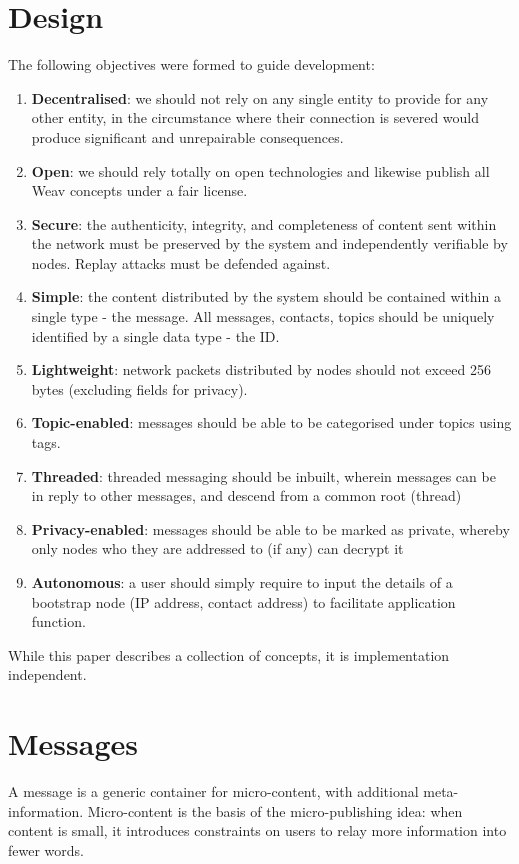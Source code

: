 \documentclass[10pt,a4paper,onecolumn]{article}
\begin{document}
\section{Design}
The following objectives were formed to guide development:
\begin{enumerate}
\item \textbf{Decentralised}: we should not rely on any single entity to provide for any other entity, in the circumstance where their connection is severed would produce significant and unrepairable consequences. 
\item \textbf{Open}: we should rely totally on open technologies and likewise publish all Weav concepts under a fair license.
\item \textbf{Secure}: the authenticity, integrity, and completeness of content sent within the network must be preserved by the system and independently verifiable by nodes. Replay attacks must be defended against.
\item \textbf{Simple}: the content distributed by the system should be contained within a single type - the message. All messages, contacts, topics should be uniquely identified by a single data type - the ID.
\item \textbf{Lightweight}: network packets distributed by nodes should not exceed 256 bytes (excluding fields for privacy). 
\item \textbf{Topic-enabled}: messages should be able to be categorised under topics using tags.
\item \textbf{Threaded}: threaded messaging should be inbuilt, wherein messages can be in reply to other messages, and descend from a common root (thread)
\item \textbf{Privacy-enabled}: messages should be able to be marked as private, whereby only nodes who they are addressed to (if any) can decrypt it
\item \textbf{Autonomous}: a user should simply require to input the details of a bootstrap node (IP address, contact address) to facilitate application function.
\end{enumerate}

While this paper describes a collection of concepts, it is implementation independent.

\section{Messages}
A message is a generic container for micro-content, with additional meta-information. Micro-content is the basis of the micro-publishing idea: when content is small, it introduces constraints on users to relay more information into fewer words.  
\end{document}
